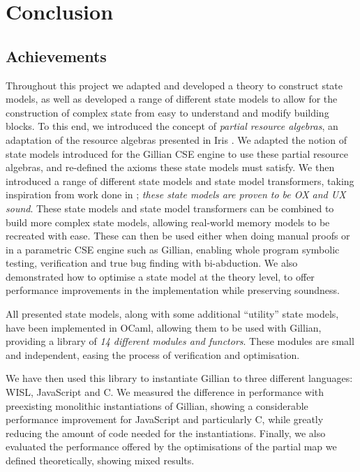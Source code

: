 \chapter{Conclusion} \label{chap:conclusion}

\section{Achievements}

Throughout this project we adapted and developed a theory to construct state models, as well as developed a range of different state models to allow for the construction of complex state from easy to understand and modify building blocks. To this end, we introduced the concept of \emph{partial resource algebras}, an adaptation of the resource algebras presented in Iris \cite{iris}. We adapted the notion of state models introduced for the Gillian CSE engine \cite{sacha-phd,cse2,gillan0} to use these partial resource algebras, and re-defined the axioms these state models must satisfy. We then introduced a range of different state models and state model transformers, taking inspiration from work done in \cite{iris,sacha-phd}; \emph{these state models are proven to be OX and UX sound}. These state models and state model transformers can be combined to build more complex state models, allowing real-world memory models to be recreated with ease. These can then be used either when doing manual proofs or in a parametric CSE engine such as Gillian, enabling whole program symbolic testing, verification and true bug finding with bi-abduction. We also demonstrated how to optimise a state model at the theory level, to offer performance improvements in the implementation while preserving soundness. 

All presented state models, along with some additional ``utility'' state models, have been implemented in OCaml, allowing them to be used with Gillian, providing a library of \emph{14 different modules and functors}. These modules are small and independent, easing the process of verification and optimisation.

 We have then used this library to instantiate Gillian to three different languages: WISL, JavaScript and C. We measured the difference in performance with preexisting monolithic instantiations of Gillian, showing a considerable performance improvement for JavaScript and particularly C, while greatly reducing the amount of code needed for the instantiations. Finally, we also evaluated the performance offered by the optimisations of the partial map we defined theoretically, showing mixed results.

